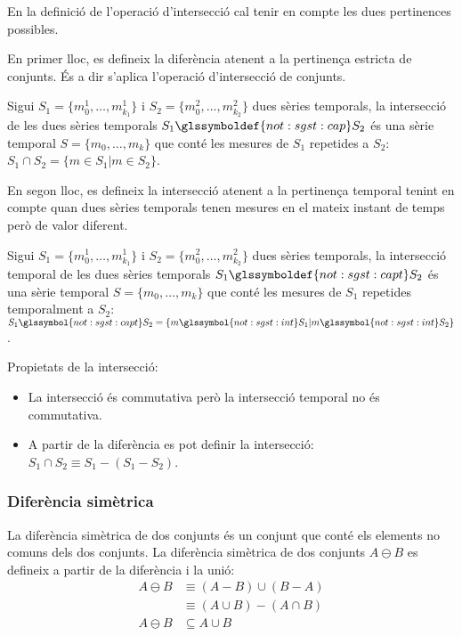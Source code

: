 En la definició de l'operació d'intersecció cal tenir en compte les
dues pertinences possibles.

En primer lloc, es defineix la diferència atenent a la pertinença
estricta de conjunts. És a dir s'aplica l'operació d'intersecció de
conjunts.
\begin{definition}[Intersecció]
  Sigui $S_1=\{m_0^1, \dotsc, m_{k_1}^1\}$ i $S_2=\{m_0^2, \dotsc,
  m_{k_2}^2\}$ dues sèries temporals, la intersecció de les dues
  sèries temporals $S_1 \glssymboldef{not:sgst:cap} S_2$ és una sèrie
  temporal $S=\{m_0, \dotsc, m_k\}$ que conté les mesures de $S_1$
  repetides a $S_2$: $S_1 \cap S_2 = \{ m \in S_1 | m \in S_2 \}$.
\end{definition}

En segon lloc, es defineix la intersecció atenent a la pertinença
temporal tenint en compte quan dues sèries temporals tenen mesures en
el mateix instant de temps però de valor diferent.
\begin{definition}
  Sigui $S_1=\{m_0^1, \dotsc, m_{k_1}^1\}$ i $S_2=\{m_0^2, \dotsc,
  m_{k_2}^2\}$ dues sèries temporals, la intersecció temporal de les
  dues sèries temporals $S_1 \glssymboldef{not:sgst:capt} S_2$ és una
  sèrie temporal $S=\{m_0, \dotsc, m_k\}$ que conté les mesures de
  $S_1$ repetides temporalment a $S_2$: $S_1 \glssymbol{not:sgst:capt}
  S_2 = \{ m \glssymbol{not:sgst:int} S_1 | m \glssymbol{not:sgst:int} S_2 \}$.
\end{definition}

Propietats de la intersecció:
\begin{itemize}
\item La intersecció és commutativa però la intersecció temporal no és
  commutativa.
\item A partir de la diferència es pot definir la intersecció: $S_1
  \cap S_2 \equiv S_1 - (S_1 - S_2)$.
\end{itemize}


\subsubsection{Diferència simètrica}

La diferència simètrica de dos conjunts és un conjunt que conté els
elements no comuns dels dos conjunts. La diferència simètrica de dos
conjunts $A \ominus B$ es defineix a partir de la diferència i la
unió:
\begin{align*}
A \ominus B  & \equiv (A-B)\cup(B-A)\\
             & \equiv (A\cup B)-(A\cap B)  \\
A \ominus B  & \subseteq A\cup B
\end{align*}

